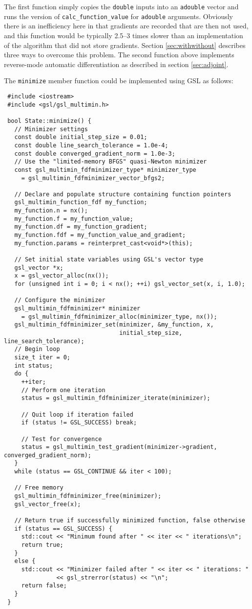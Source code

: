 \documentclass[a4,oneside]{book}
\def\codesize{\small}
\def\code#1{{\codesize\texttt{#1}}}
\begin{document}
%
The first function simply copies the \code{double} inputs into an
\code{adouble} vector and runs the version of
\code{calc\_function\_value} for \code{adouble} arguments. Obviously
there is an inefficiency here in that gradients are recorded that are
then not used, and this function would be typically 2.5--3 times
slower than an implementation of the algorithm that did not store
gradients.  Section \ref{sec:withwithout} describes three ways to
overcome this problem.  The second function above implements
reverse-mode automatic differentiation as described in section
\ref{sec:adjoint}.

The \code{minimize} member function could be implemented using GSL as
follows:
%
\begin{lstlisting}
 #include <iostream>
 #include <gsl/gsl_multimin.h>

 bool State::minimize() {
   // Minimizer settings
   const double initial_step_size = 0.01;
   const double line_search_tolerance = 1.0e-4;
   const double converged_gradient_norm = 1.0e-3;
   // Use the "limited-memory BFGS" quasi-Newton minimizer
   const gsl_multimin_fdfminimizer_type* minimizer_type
     = gsl_multimin_fdfminimizer_vector_bfgs2;

   // Declare and populate structure containing function pointers
   gsl_multimin_function_fdf my_function;
   my_function.n = nx();
   my_function.f = my_function_value;
   my_function.df = my_function_gradient;
   my_function.fdf = my_function_value_and_gradient;
   my_function.params = reinterpret_cast<void*>(this);
   
   // Set initial state variables using GSL's vector type
   gsl_vector *x;
   x = gsl_vector_alloc(nx());
   for (unsigned int i = 0; i < nx(); ++i) gsl_vector_set(x, i, 1.0);

   // Configure the minimizer
   gsl_multimin_fdfminimizer* minimizer
     = gsl_multimin_fdfminimizer_alloc(minimizer_type, nx());
   gsl_multimin_fdfminimizer_set(minimizer, &my_function, x,
                                 initial_step_size, line_search_tolerance);
   // Begin loop
   size_t iter = 0;
   int status;
   do {
     ++iter;
     // Perform one iteration
     status = gsl_multimin_fdfminimizer_iterate(minimizer);

     // Quit loop if iteration failed
     if (status != GSL_SUCCESS) break;
    
     // Test for convergence
     status = gsl_multimin_test_gradient(minimizer->gradient, converged_gradient_norm);
   }
   while (status == GSL_CONTINUE && iter < 100);

   // Free memory
   gsl_multimin_fdfminimizer_free(minimizer);
   gsl_vector_free(x);

   // Return true if successfully minimized function, false otherwise
   if (status == GSL_SUCCESS) {
     std::cout << "Minimum found after " << iter << " iterations\n";
     return true;
   }
   else {
     std::cout << "Minimizer failed after " << iter << " iterations: "
               << gsl_strerror(status) << "\n";
     return false;
   }
 }
\end{lstlisting}
\end{document}
